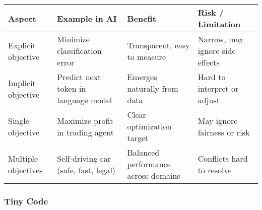 \documentclass[
  letterpaper,
  DIV=11,
  numbers=noendperiod]{scrreprt}
\begin{document}
\begin{longtable}[]{@{}
  >{\raggedright\arraybackslash}p{}
  >{\raggedright\arraybackslash}p{}
  >{\raggedright\arraybackslash}p{}
  >{\raggedright\arraybackslash}p{}@{}}
\toprule\noalign{}
\begin{minipage}[b]{\linewidth}\raggedright
Aspect
\end{minipage} & \begin{minipage}[b]{\linewidth}\raggedright
Example in AI
\end{minipage} & \begin{minipage}[b]{\linewidth}\raggedright
Benefit
\end{minipage} & \begin{minipage}[b]{\linewidth}\raggedright
Risk / Limitation
\end{minipage} \\
\midrule\noalign{}
\endhead
\bottomrule\noalign{}
\endlastfoot
Explicit objective & Minimize classification error & Transparent, easy
to measure & Narrow, may ignore side effects \\
Implicit objective & Predict next token in language model & Emerges
naturally from data & Hard to interpret or adjust \\
Single objective & Maximize profit in trading agent & Clear optimization
target & May ignore fairness or risk \\
Multiple objectives & Self-driving car (safe, fast, legal) & Balanced
performance across domains & Conflicts hard to resolve \\
\end{longtable}

\subsubsection{Tiny Code}\label{tiny-code-10}
\end{document}
